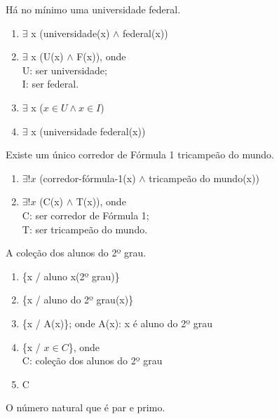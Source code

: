 \bigskip
\begin{exemplo} Há no mínimo uma universidade federal.
 \end{exemplo}

\begin{enumerate}[label=(\roman*)]
    \item $\exists$ x (universidade(x) $\land$ federal(x))
    \item $\exists$ x (U(x) $\land$ F(x)), onde\\
    U: ser universidade;\\
    I: ser federal.
    \item $\exists$ x ($x \in U \land x \in I$)
    \item $\exists$ x (universidade federal(x))
\end{enumerate}

\bigskip
\begin{exemplo} Existe um único corredor de Fórmula 1 tricampeão do mundo.
\end{exemplo}

\begin{enumerate}[label=(\roman*)]
    \item $\exists!x$ (corredor-fórmula-1(x) $\land$ tricampeão do mundo(x))
    \item $\exists!x$ (C(x) $\land$ T(x)), onde\\
    C: ser corredor de Fórmula 1;\\
    T: ser tricampeão do mundo.
\end{enumerate}

\bigskip
\begin{exemplo} A coleção dos alunos do 2º grau.
\end{exemplo}

\begin{enumerate}[label=(\roman*)]
    \item \{x / aluno x(2º grau)\}
    \item \{x / aluno do 2º grau(x)\}
    \item \{x / A(x)\}; onde A(x): x é aluno do 2º grau
    \item \{x / $x \in C$\}, onde\\
    C: coleção dos alunos do 2º grau
    \item C
\end{enumerate}

\bigskip
\begin{exemplo} O número natural que é par e primo.
\end{exemplo}

